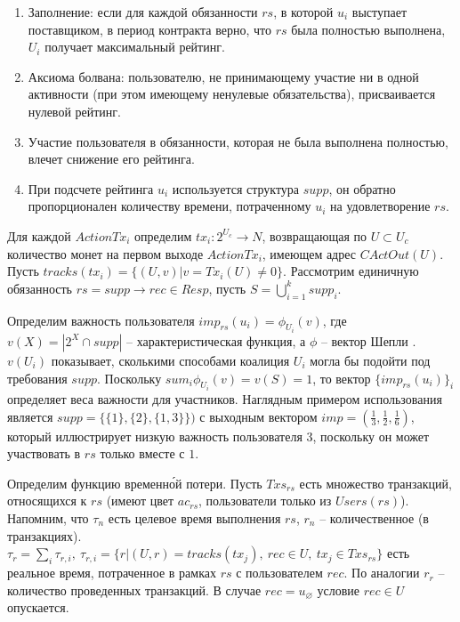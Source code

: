 \documentclass[specification,annotation]{itmo-student-thesis}
\begin{document}
\begin{enumerate}
\item Заполнение: если для каждой обязанности $rs$, в которой $u_i$
  выступает поставщиком, в период контракта верно, что $rs$ была
  полностью выполнена, $U_i$ получает максимальный рейтинг.
\item Аксиома болвана: пользователю, не принимающему участие ни в
  одной активности (при этом имеющему ненулевые обязательства),
  присваивается нулевой рейтинг.
\item Участие пользователя в обязанности, которая не была выполнена
  полностью, влечет снижение его рейтинга.
\item При подсчете рейтинга $u_i$ используется структура $supp$, он
  обратно пропорционален количеству времени, потраченному $u_i$ на
  удовлетворение $rs$.
\end{enumerate}

Для каждой $ActionTx_i$ определим $tx_i : 2^{U_c} \rightarrow N$,
возвращающая по $U \subset U_c$ количество монет на первом выходе
$ActionTx_i$, имеющем адрес $CActOut(U)$. Пусть $tracks(tx_i) = \{
(U,v) | v = Tx_i(U) \neq 0 \}$. Рассмотрим единичную обязанность $rs =
supp \rightarrow rec \in Resp$, пусть $S = \bigcup_{i=1}^{k}{supp_i}$.

Определим важность пользователя $imp_{rs}(u_i) = \phi_{U_i}(v)$, где
$v(X) = |2^X \cap supp|$ -- характеристическая функция, а $\phi$ --
вектор Шепли \cite{shapley} \cite{petrosyan}. $v(U_i)$ показывает,
сколькими способами коалиция $U_i$ могла бы подойти под требования
$supp$. Поскольку $sum_i{\phi_{U_i}(v)} = v(S) = 1$, то вектор
$\{imp_{rs}(u_i)\}_i$ определяет веса важности для
участников. Наглядным примером использования является $supp =
\{\{1\},\{2\},\{1,3\}\})$ с выходным вектором $imp = (\frac{1}{3},
\frac{1}{2}, \frac{1}{6})$, который иллюстрирует низкую важность
пользователя $3$, поскольку он может участвовать в $rs$ только вместе
с $1$.

Определим функцию временн\'{о}й потери. Пусть $Txs_{rs}$ есть
множество транзакций, относящихся к $rs$ (имеют цвет $ac_{rs}$,
пользователи только из $Users(rs)$). Напомним, что $\tau_n$ есть
целевое время выполнения $rs$, $r_n$ -- количественное (в
транзакциях). $\tau_r = \sum_i{\tau_{r,i}},\ \tau_{r,i} = \{r | (U,r)
= tracks(tx_j),\ rec \in U, \ tx_j \in Txs_{rs}\}$ есть реальное время,
  потраченное в рамках $rs$ с пользователем $rec$. По аналогии $r_r$
  -- количество проведенных транзакций. В случае $rec =
  u_{\varnothing}$ условие $rec \in U$ опускается.
\end{document}
